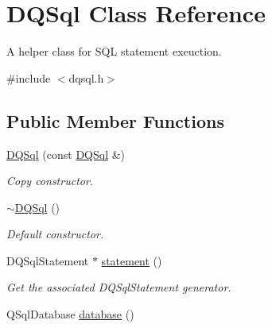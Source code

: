 \hypertarget{classDQSql}{
\section{DQSql Class Reference}
\label{classDQSql}
}


A helper class for SQL statement exeuction.  




{\ttfamily \#include $<$dqsql.h$>$}

\subsection*{Public Member Functions}
\begin{DoxyCompactItemize}
\item 
\hypertarget{classDQSql_a4be9d345a9ebe39ff8e90282831fd763}{
\hyperlink{classDQSql_a4be9d345a9ebe39ff8e90282831fd763}{DQSql} (const \hyperlink{classDQSql}{DQSql} \&)}
\label{classDQSql_a4be9d345a9ebe39ff8e90282831fd763}

\begin{DoxyCompactList}\small\item\em Copy constructor. \item\end{DoxyCompactList}\item 
\hypertarget{classDQSql_aea11795301aa7f38e23216f965bf5903}{
\hyperlink{classDQSql_aea11795301aa7f38e23216f965bf5903}{$\sim$DQSql} ()}
\label{classDQSql_aea11795301aa7f38e23216f965bf5903}

\begin{DoxyCompactList}\small\item\em Default constructor. \item\end{DoxyCompactList}\item 
\hypertarget{classDQSql_ac90e473d732f1fa163ca58c0cbbae86c}{
DQSqlStatement $\ast$ \hyperlink{classDQSql_ac90e473d732f1fa163ca58c0cbbae86c}{statement} ()}
\label{classDQSql_ac90e473d732f1fa163ca58c0cbbae86c}

\begin{DoxyCompactList}\small\item\em Get the associated DQSqlStatement generator. \item\end{DoxyCompactList}\item 
\hypertarget{classDQSql_ac7774b96b9dd3fa4a6bdb56888c8993a}{
QSqlDatabase \hyperlink{classDQSql_ac7774b96b9dd3fa4a6bdb56888c8993a}{database} ()}
\label{classDQSql_ac7774b96b9dd3fa4a6bdb56888c8993a}


\end{DoxyCompactItemize}

